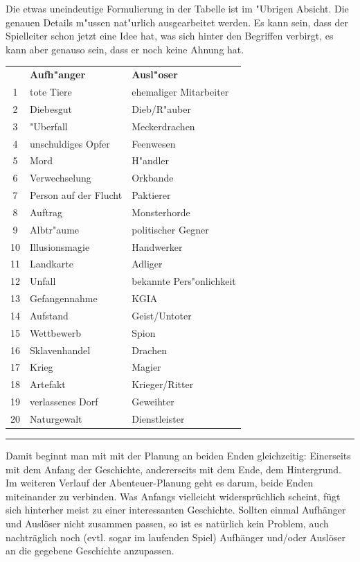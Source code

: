 Die etwas uneindeutige Formulierung in der Tabelle ist im "Ubrigen Absicht. Die genauen Details m"ussen nat"urlich ausgearbeitet werden. Es kann sein, dass der Spielleiter schon jetzt eine Idee hat, was sich hinter den Begriffen verbirgt, es kann aber genauso sein, dass er noch keine Ahnung hat.

\begin{table}[t]
\begin{tabular}[C]{cl@{\qquad}l}
    & \textbf{Aufh"anger} & \textbf{Ausl"oser} \\
  1 & tote Tiere & ehemaliger Mitarbeiter \\
  2 & Diebesgut & Dieb/R"auber \\
  3 & "Uberfall & Meckerdrachen \\
  4 & unschuldiges Opfer & Feenwesen \\
  5 & Mord & H"andler \\
  6 & Verwechselung & Orkbande\\
  7 & Person auf der Flucht & Paktierer\\
  8 & Auftrag & Monsterhorde \\
  9 & Albtr"aume & politischer Gegner \\
 10 & Illusionsmagie & Handwerker \\
 11 & Landkarte & Adliger \\
 12 & Unfall & bekannte Pers"onlichkeit \\
 13 & Gefangennahme & KGIA \\
 14 & Aufstand & Geist/Untoter \\
 15 & Wettbewerb & Spion \\
 16 & Sklavenhandel & Drachen \\
 17 & Krieg & Magier \\
 18 & Artefakt & Krieger/Ritter \\
 19 & verlassenes Dorf & Geweihter \\
 20 & Naturgewalt & Dienstleister \\
\end{tabular}
\label{AufhaengerUndAusloeser}

\medskip\hrule
\end{table}

Damit beginnt man mit mit der Planung an beiden Enden gleichzeitig: Einerseits mit dem Anfang der Geschichte, andererseits mit dem Ende, dem Hintergrund. Im weiteren Verlauf der Abenteuer-Planung geht es darum, beide Enden miteinander zu verbinden. Was Anfangs vielleicht widersprüchlich scheint, fügt sich hinterher meist zu einer interessanten Geschichte. Sollten einmal Aufhänger und Auslöser nicht zusammen passen, so ist es natürlich kein Problem, auch nachträglich noch (evtl. sogar im laufenden Spiel) Aufhänger und/oder Auslöser an die gegebene Geschichte anzupassen.


